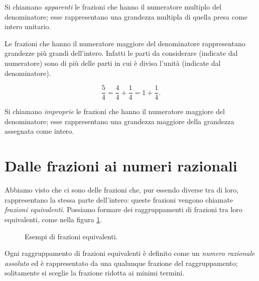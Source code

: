 \begin{definizione}
 Si chiamano \emph{apparenti} le frazioni che hanno il numeratore multiplo del denominatore;
esse rappresentano una grandezza multipla di quella presa come intero unitario.
\end{definizione}

Le frazioni che hanno il numeratore maggiore del denominatore rappresentano grandezze più grandi dell'intero.
Infatti le parti da considerare (indicate dal numeratore) sono di più delle parti in cui è divisa l'unità
(indicate dal denominatore).
\begin{center}
 
\end{center}
\[\frac{5}{4}=\frac{4}{4}+\frac{1}{4}=1+\frac{1}{4}.\]

\begin{definizione}
 Si chiamano \emph{improprie} le frazioni che hanno il numeratore maggiore del denominatore;
esse rappresentano una grandezza maggiore della grandezza assegnata come intero.
\end{definizione}

\ovalbox{\risolvii \ref{ese:3.5}, \ref{ese:3.6}, \ref{ese:3.7}, \ref{ese:3.8}, \ref{ese:3.9}, \ref{ese:3.10}, \ref{ese:3.11},
\ref{ese:3.12}, \ref{ese:3.13}, \ref{ese:3.14}, \ref{ese:3.15}, \ref{ese:3.16}, \ref{ese:3.17},}

\vspazio\ovalbox{\ref{ese:3.18}, \ref{ese:3.19}, \ref{ese:3.20}, \ref{ese:3.21}}

\section{Dalle frazioni ai numeri razionali}

Abbiamo visto che ci sono delle frazioni che, pur essendo diverse tra di loro, rappresentano la stessa
parte dell'intero: queste frazioni vengono chiamate \emph{frazioni equivalenti}.
Possiamo formare dei raggruppamenti di frazioni tra loro equivalenti, come nella figura \ref{fig:frazequiv}.

\begin{figure}[ht]
\centering 
\caption{Esempi di frazioni equivalenti.}\label{fig:frazequiv}
\end{figure}

\begin{definizione}
Ogni raggruppamento di frazioni equivalenti è definito come un \emph{numero razionale assoluto}
ed è rappresentato da una qualunque
frazione del raggruppamento; solitamente si sceglie la frazione ridotta ai minimi termini.
\end{definizione}

